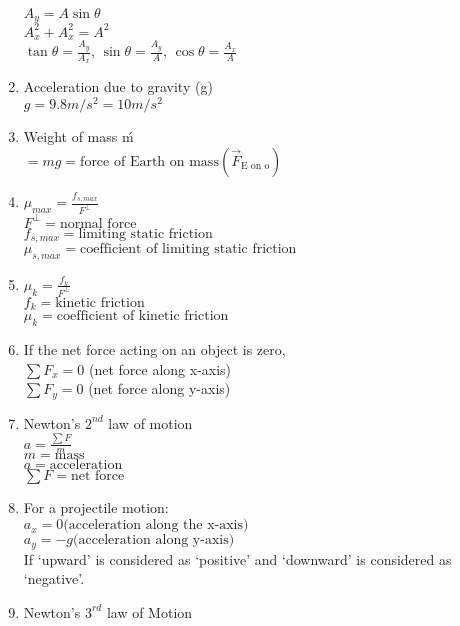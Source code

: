 \documentclass[12pt, letterpaper]{article}
\begin{document}
\begin{enumerate}
              $A_y = A \sin \theta$\\
              $A_x^2 + A_x^2 = A^2$\\
              $\tan \theta = \frac{A_y}{A_x}$, $\sin \theta = \frac{A_y}{A}$, $\cos \theta = \frac{A_x}{A}$
        \item Acceleration due to gravity (g)\\
              $g = 9.8 m/s^2 = 10 m/s^2$
        \item Weight of mass \'m\'\\
              $= mg = \text{force of Earth on mass} (\overrightarrow F_{\text{E on o}})$
        \item $\mu_{max} = \frac{f_{s, max}}{F^{\perp}}$\\
              $F^\perp = \text{normal force}$\\
              $f_{s, max} = \text{limiting static friction}$\\
              $\mu_{s, max} = \text{coefficient of limiting static friction}$
        \item $\mu_k = \frac{f_k}{F^{\perp}}$\\
              $f_k = \text{kinetic friction}$\\
              $\mu_k = \text{coefficient of kinetic friction}$
        \item If the net force acting on an object is zero,\\
              $\sum F_x = 0$ (net force along x-axis)\\
              $\sum F_y = 0$ (net force along y-axis)
        \item Newton's $2^{nd}$ law of motion\\
              $a = \frac{\sum F}{m}$\\
              $m = \text{mass}$\\
              $a = \text{acceleration}$\\
              $\sum F =\text{net force}$
        \item For a projectile motion:\\
              $a_x = 0 \text{(acceleration along the x-axis)}$\\
              $a_y = -g \text{(acceleration along y-axis)}$\\
              If `upward' is considered as `positive' and `downward' is considered as `negative'.
        \item Newton's $3^{rd}$ law of Motion\\

\end{enumerate}
\end{document}
